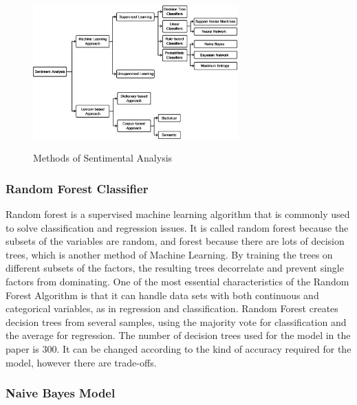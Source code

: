 \documentclass{article}
\begin{document}
\begin{figure}[!h]
    \centering
    \includegraphics[width=0.7\textwidth, left]
    {Supervised_Learning_Methods.jpg}
    \caption{Methods of Sentimental Analysis}
    \cite{5}
    \label{fig:SentimentalAnalysis}
\end{figure}


\subsubsection{Random Forest Classifier}
Random forest is a supervised machine learning algorithm that is commonly used to solve classification and regression issues. It is called random forest because  the subsets of the variables are random, and forest because there are lots of decision trees, which is another  method of Machine Learning. By training the trees on different subsets of the factors, the resulting trees decorrelate and prevent single factors from dominating. One of the most essential characteristics of the Random Forest Algorithm is that it can handle data sets with both continuous and categorical variables, as in regression and classification. Random Forest creates decision trees from several samples, using the majority vote for classification and the average for regression. The number of decision trees used for the model in the paper is 300. It can be changed according to the kind of accuracy required for the model,  however there are trade-offs. 



\subsubsection{Naive Bayes Model}
\end{document}
